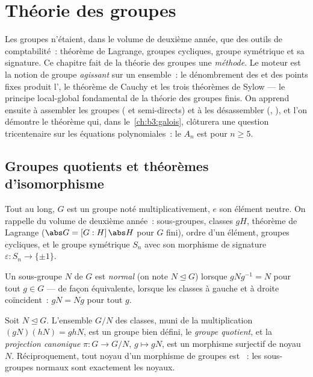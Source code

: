 \chapter{Théorie des groupes}\label{ch:b3:groups}

Les groupes n'étaient, dans le volume de deuxième année, que des
outils de comptabilité~: théorème de Lagrange, groupes cycliques,
groupe symétrique et sa signature. Ce chapitre fait de la théorie
des groupes une \emph{méthode}. Le moteur est la notion de groupe
\emph{agissant} sur un ensemble~: le dénombrement des  et
des points fixes produit l', le théorème de
Cauchy et les trois théorèmes de Sylow --- le principe
local-global fondamental de la théorie des groupes finis. On
apprend ensuite à assembler les groupes ( et
semi-directs) et à les désassembler (,
), et l'on démontre le théorème qui, dans
le~\cref{ch:b3:galois}, clôturera une question tricentenaire sur
les équations polynomiales~: le  $A_n$ est 
pour $n \geq 5$.

\section{Groupes quotients et théorèmes d'isomorphisme}

Tout au long, $G$ est un groupe noté multiplicativement, $e$ son
élément neutre. On rappelle du volume de deuxième année~:
sous-groupes, classes $gH$, théorème de Lagrange ($\abs G =
[G:H]\,\abs H$ pour $G$ fini), ordre d'un élément, groupes
cycliques, et le groupe symétrique $S_n$ avec son morphisme de
signature $\varepsilon \colon S_n \to \{\pm1\}$.

\begin{definition}\label{def:b3:groups:normal}
Un sous-groupe $N$ de $G$ est \emph{normal}
(on note $N \trianglelefteq G$) lorsque $gNg^{-1} = N$ pour tout $g
\in G$ --- de façon équivalente, lorsque les classes à gauche et à
droite coïncident~: $gN = Ng$ pour tout $g$.
\end{definition}

\begin{theorem}\label{thm:b3:groups:quotient}
Soit $N \trianglelefteq G$. L'ensemble $G/N$ des classes, muni de
la multiplication $(gN)(hN) = ghN$, est un groupe bien défini, le
\emph{groupe quotient}, et la
\emph{projection canonique} $\pi \colon G \to G/N$, $g \mapsto gN$,
est un morphisme surjectif de noyau $N$. Réciproquement, tout noyau
d'un morphisme de groupes est ~: les sous-groupes normaux
sont exactement les noyaux.
\end{theorem}

